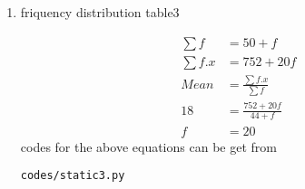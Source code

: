 \renewcommand{\theequation}{\theenumi}
\begin{enumerate}[label=\arabic*.,ref=\thesubsection.\theenumi]
\item \begin{table}[!ht]
	\centering
	
	\caption{friquency distribution table3 }
\end{table}
	
\begin{align}
\sum{f} &= 50 +f
\\
\sum{f.x} &= 752 + 20f
\\
Mean &= \frac{\sum{f.x}}{\sum{f}}
\\18 &= \frac{752+20f}{44 +f}
\\f&= 20
\end{align}
codes for the above equations can be get from
\begin{lstlisting}
codes/static3.py
\end{lstlisting}
\end{enumerate}